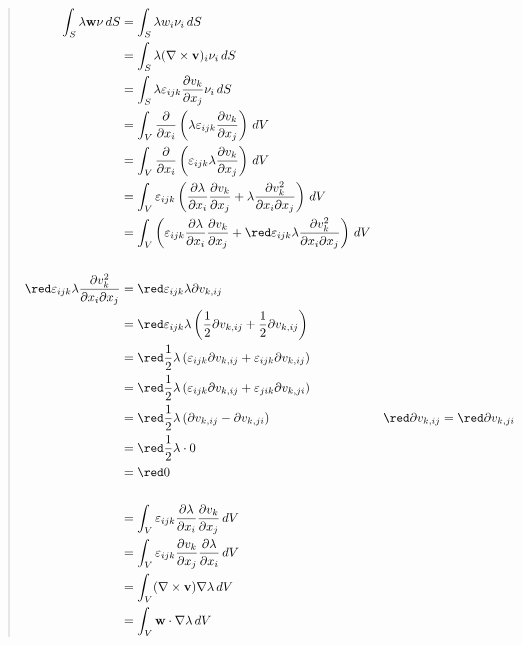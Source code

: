\documentclass[a4paper,10pt,twoside,final,spanish]{article}
\begin{document}
\begin{enumerate}[a.]
\begin{quote}
\begin{tcolorbox}[colback=gray!10!white,colframe=black!0!white]

\begin{align*}
\int_{S}\lambda\mathbf{w}\nu\,dS &= \int_{S}\lambda w_{i}\nu_{i}\,dS \\
&= \int_{S}\lambda (\nabla\times\mathbf{v})_{i}\nu_{i}\,dS \\
&= \int_{S}\lambda\varepsilon_{ijk}\frac{\partial v_{k}}{\partial x_{j}}\nu_{i}\,dS \\
&= \int_{V}\frac{\partial}{\partial x_{i}}
\left(\lambda\varepsilon_{ijk}\frac{\partial v_{k}}{\partial x_{j}}\right)\,dV \\
&= \int_{V}\frac{\partial}{\partial x_{i}}
\left(\varepsilon_{ijk}\lambda\frac{\partial v_{k}}{\partial x_{j}}\right)\,dV \\
&= \int_{V}\varepsilon_{ijk}
\left(\frac{\partial\lambda}{\partial x_{i}}\frac{\partial v_{k}}{\partial {x_{j}}}
+\lambda\frac{\partial v_{k}^{2}}{\partial x_{i}\partial x_{j}}\right)\,dV \\
&= \int_{V}
\left(\varepsilon_{ijk}\frac{\partial\lambda}{\partial x_{i}}\frac{\partial v_{k}}{\partial x_{j}}
+{\red \varepsilon_{ijk}\lambda\frac{\partial v_{k}^{2}}{\partial x_{i}\partial x_{j}}}\right)\,dV \\ \\
{\red \varepsilon_{ijk}\lambda\frac{\partial v_{k}^{2}}{\partial x_{i}\partial x_{j}}}
&= {\red \varepsilon_{ijk}\lambda\partial v_{k,ij}} \\
&= {\red \varepsilon_{ijk}\lambda
\left(\frac{1}{2}\partial v_{k,ij}+\frac{1}{2}\partial v_{k,ij}\right)} \\
&= {\red \frac{1}{2}\lambda
\left(\varepsilon_{ijk}\partial v_{k,ij}+\varepsilon_{ijk}\partial v_{k,ij}\right)} \\
&= {\red \frac{1}{2}\lambda
\left(\varepsilon_{ijk}\partial v_{k,ij}+\varepsilon_{jik}\partial v_{k,ji}\right)} \\
&= {\red \frac{1}{2}\lambda
\left(\partial v_{k,ij}-\partial v_{k,ji}\right)}
& {\red \partial v_{k,ij}} &= {\red \partial v_{k,ji}} \\
&= {\red \frac{1}{2}\lambda\cdot 0} \\
&= {\red 0} \\ \\
&= \int_{V}\varepsilon_{ijk}
\frac{\partial\lambda}{\partial x_{i}}\frac{\partial v_{k}}{\partial x_{j}}\,dV \\
&= \int_{V}\varepsilon_{ijk}
\frac{\partial v_{k}}{\partial x_{j}}\frac{\partial\lambda}{\partial x_{i}}\,dV \\
&= \int_{V}(\nabla\times\mathbf{v})\nabla\lambda\,dV \\
&= \int_{V}\mathbf{w}\cdot\nabla\lambda\,dV \\
\end{align*}

\end{tcolorbox}
\end{quote}

\end{enumerate}
\end{document}
